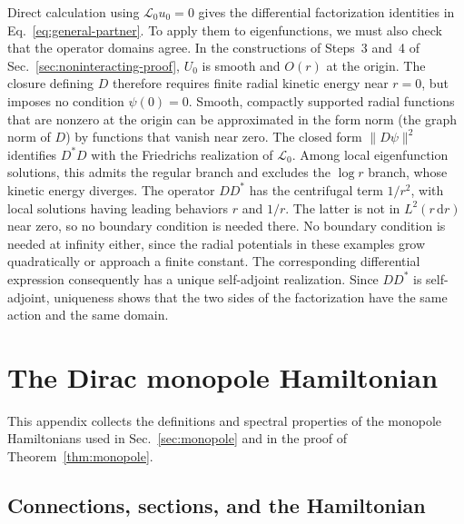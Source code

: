 \documentclass[11pt,a4paper]{article}
\theoremstyle{remark}
\theoremstyle{plain}
\begin{document}
Direct calculation using $\mathcal L_0u_0=0$ gives the differential
factorization identities in Eq.~\eqref{eq:general-partner}.
To apply them to eigenfunctions, we must also check that the operator
domains agree. In the constructions of Steps~3 and~4 of
Sec.~\ref{sec:noninteracting-proof}, $U_0$ is smooth and $O(r)$ at the origin.
The closure defining $D$ therefore requires finite radial kinetic
energy near $r=0$, but imposes no condition $\psi(0)=0$.
Smooth, compactly supported radial functions that are nonzero at the
origin can be approximated in the form norm (the graph norm of $D$)
by functions that vanish near zero. The closed form $\|D\psi\|^2$
identifies $D^*D$ with the Friedrichs realization of $\mathcal L_0$.
Among local eigenfunction solutions, this admits the regular branch
and excludes the $\log r$ branch, whose kinetic energy diverges.
The operator $DD^*$ has the centrifugal term $1/r^2$, with local
solutions having leading behaviors $r$ and $1/r$. The latter is not
in $L^2(r\,\mathrm{d}r)$ near zero, so no boundary condition is needed there.
No boundary condition is needed at infinity either, since the radial
potentials in these examples grow quadratically or approach a finite
constant. The corresponding differential expression consequently has
a unique self-adjoint realization. Since $DD^*$ is self-adjoint,
uniqueness shows that the two sides of the factorization have the
same action and the same domain.

\section{The Dirac monopole Hamiltonian}
\label{app:monopole}

This appendix collects the definitions and spectral properties
of the monopole Hamiltonians used in Sec.~\ref{sec:monopole} and in
the proof of Theorem~\ref{thm:monopole}.

\subsection{Connections, sections, and the Hamiltonian}
\label{app:monopole-definitions}
\end{document}
